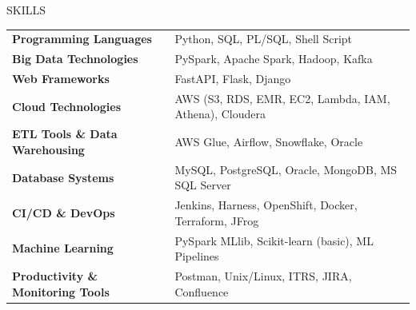 \documentclass{resume} %
\begin{document}
\begin{rSection}{SKILLS}
\begin{tabular}{ @{} >{\bfseries}l @{\hspace{6ex}} l }
Programming Languages & Python, SQL, PL/SQL, Shell Script \\
Big Data Technologies & PySpark, Apache Spark, Hadoop, Kafka \\
Web Frameworks & FastAPI, Flask, Django \\
Cloud Technologies &  AWS (S3, RDS, EMR, EC2, Lambda, IAM, Athena), Cloudera \\
ETL Tools \& Data Warehousing & AWS Glue, Airflow, Snowflake, Oracle \\
\textbf{Database Systems} & MySQL, PostgreSQL, Oracle, MongoDB, MS SQL Server \\
\textbf{CI/CD \& DevOps} & Jenkins, Harness, OpenShift, Docker, Terraform, JFrog \\
Machine Learning & PySpark MLlib, Scikit-learn (basic), ML Pipelines \\
Productivity \& Monitoring Tools & Postman, Unix/Linux, ITRS, JIRA, Confluence \\
\end{tabular}\\
\end{rSection}
\end{document}
